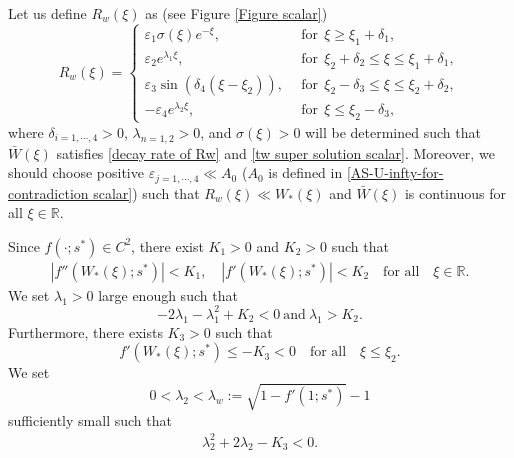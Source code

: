 \documentclass[11pt,a4paper]{article}
\numberwithin{equation}{section}
\numberwithin{figure}{section}
\newcommand\bea{\begin{eqnarray}}
\newcommand\eea{\end{eqnarray}}
\begin{document}
\noindent

Let us define $R_w(\xi)$ as (see Figure \ref{Figure scalar})
\begin{equation}\label{definition of Rw}
R_w(\xi)=\begin{cases}
\varepsilon_1\sigma(\xi) e^{-\xi},&\ \ \mbox{for}\ \ \xi\ge\xi_{1}+\delta_1,\\
\varepsilon_2 e^{\lambda_1\xi},&\ \ \mbox{for}\ \ \xi_{2}+\delta_2\le\xi\le\xi_{1}+\delta_1,\\
\varepsilon_3\sin(\delta_4(\xi-\xi_2)),&\ \ \mbox{for}\ \ \xi_2-\delta_3\le\xi\le\xi_2+\delta_2,\\
-\varepsilon_4e^{\lambda_2\xi},&\ \ \mbox{for}\ \ \xi\le\xi_2-\delta_3,
\end{cases}
\end{equation}
where $\delta_{i=1,\cdots,4}>0$, $\lambda_{n=1,2}>0$, and $\sigma(\xi)>0$ will be
determined such that $\bar W(\xi)$ satisfies \eqref{decay rate of Rw} and \eqref{tw super solution scalar}. Moreover, we should choose
positive $\varepsilon_{j=1,\cdots,4}\ll A_0$ ($A_0$ is defined in \eqref{AS-U-infty-for-contradiction scalar}) such that $R_w(\xi)\ll W_*(\xi)$ and $\bar W(\xi)$ is continuous for all $\xi\in\mathbb{R}$.


Since $f(\cdot;s^*)\in C^2$, there exist $K_1>0$ and $K_2>0$ such that
\bea\label{K1K2}
|f''(W_*(\xi);s^*)|< K_1,\quad |f'(W_*(\xi);s^*)|< K_2\quad \mbox{for all}\quad\xi\in\mathbb{R}.
\eea
We set $\lambda_1>0$ %
large enough such that
\begin{equation}\label{condition on lambda 1}
-2\lambda_1-\lambda_1^2+K_2<0\ \text{and}\ \lambda_1>K_2.
\end{equation}
Furthermore, there exists $K_3>0$ such that
\begin{equation}\label{condition on xi_2 scalar}
f'(W_*(\xi); s^*)\le -K_3<0\quad\text{for all}\quad\xi\le \xi_2.
\end{equation}
We set 
$$0<\lambda_2<\lambda_w:=\sqrt{1-f'(1;s^*)}-1$$
sufficiently small
such that
\bea\label{lambda 2}
\lambda_2^2+2\lambda_2-K_3<0.
\eea

\end{document}

